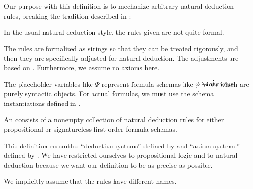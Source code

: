 \begin{comments}
  \item Our purpose with this definition is to mechanize arbitrary natural deduction rules, breaking the tradition described in \cite[13]{MartinLöf1984IntTypeTheory}:
  \begin{displayquote}
    In the usual natural deduction style, the rules given are not quite formal.
  \end{displayquote}

  The rules are formalized as strings so that they can be treated rigorously, and then they are specifically adjusted for natural deduction. The adjustments are based on \cite[sec. 2.1]{TroelstraSchwichtenberg2000Proofs}. Furthermore, we assume no axioms here.

  \item The placeholder variables like \( \Psi \) represent formula schemas like \( \syn\varphi \synimplies \syn\psi \), which are purely syntactic objects. For actual formulas, we must use the schema instantiations defined in .
\end{comments}

\begin{definition}\label{def:abstract_natural_deduction_system}\mimprovised
  An  consists of a nonempty collection of \hyperref[def:natural_deduction_rule]{natural deduction rules} for either propositional or signatureless first-order formula schemas.
\end{definition}
\begin{comments}
  \item This definition resembles \enquote{deductive systems} defined by  and \enquote{axiom systems} defined by . We have restricted ourselves to propositional logic and to natural deduction because we want our definition to be as precise as possible.
  \item We implicitly assume that the rules have different names.
\end{comments}


